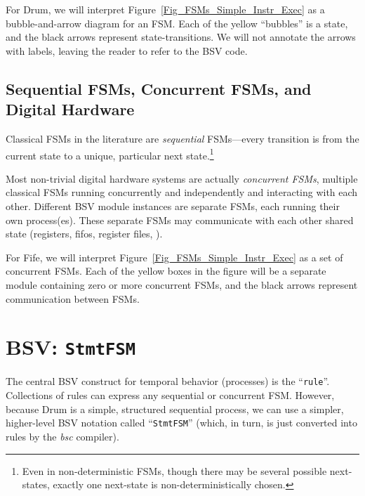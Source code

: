 
For Drum, we will interpret Figure~\ref{Fig_FSMs_Simple_Instr_Exec} as a
bubble-and-arrow diagram for an FSM.  Each of the yellow ``bubbles''
is a state, and the black arrows represent state-transitions.  We will
not annotate the arrows with labels, leaving the reader to refer to
the BSV code.


\subsection{Sequential FSMs, Concurrent FSMs, and Digital Hardware}


Classical FSMs in the literature are \emph{sequential} FSMs---every
transition is from the current state to a unique, particular next
state.\footnote{Even in non-deterministic FSMs, though there may be
several possible next-states, exactly one next-state is
non-deterministically chosen.}

Most non-trivial digital hardware systems are actually
\emph{concurrent FSMs}, {\ie} multiple classical FSMs running
concurrently and independently and interacting with each other.
Different BSV module instances are separate FSMs, each running their
own process(es).  These separate FSMs may communicate with each other
{\via} shared state (registers, fifos, register files, {\etc}).


For Fife, we will interpret Figure~\ref{Fig_FSMs_Simple_Instr_Exec} as a set
of concurrent FSMs.  Each of the yellow boxes in the figure will be a
separate module containing zero or more concurrent FSMs, and the black
arrows represent communication between FSMs.


\section{BSV: {\tt StmtFSM}}

\label{Sec_FSMs_StmtFSM}


The central BSV construct for temporal behavior (processes) is the
``\verb|rule|''.  Collections of rules can express any sequential or
concurrent FSM.  However, because Drum is a simple, structured
sequential process, we can use a simpler, higher-level BSV notation
called ``\verb|StmtFSM|'' (which, in turn, is just converted into
rules by the \emph{bsc} compiler).

